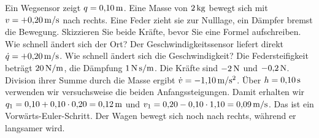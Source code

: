 Ein Wegsensor zeigt \(q=0{,}10\,\mathrm{m}\). Eine Masse von \(2\,\mathrm{kg}\) bewegt sich mit \(v=+0{,}20\,\mathrm{m/s}\) nach rechts. Eine Feder zieht sie zur Nulllage, ein Dämpfer bremst die Bewegung. Skizzieren Sie beide Kräfte, bevor Sie eine Formel aufschreiben.
Wie schnell ändert sich der Ort? Der Geschwindigkeitssensor liefert direkt \(\dot q=+0{,}20\,\mathrm{m/s}\). Wie schnell ändert sich die Geschwindigkeit? Die Federsteifigkeit beträgt \(20\,\mathrm{N/m}\), die Dämpfung \(1\,\mathrm{N\,s/m}\). Die Kräfte sind \(-2\,\mathrm{N}\) und \(-0{,}2\,\mathrm{N}\). Division ihrer Summe durch die Masse ergibt \(\dot v=-1{,}10\,\mathrm{m/s^2}\).
Über \(h=0{,}10\,\mathrm{s}\) verwenden wir versuchsweise die beiden Anfangssteigungen. Damit erhalten wir \(q_1=0{,}10+0{,}10\cdot0{,}20=0{,}12\,\mathrm{m}\) und \(v_1=0{,}20-0{,}10\cdot1{,}10=0{,}09\,\mathrm{m/s}\). Das ist ein Vorwärts-Euler-Schritt. Der Wagen bewegt sich noch nach rechts, während er langsamer wird.


